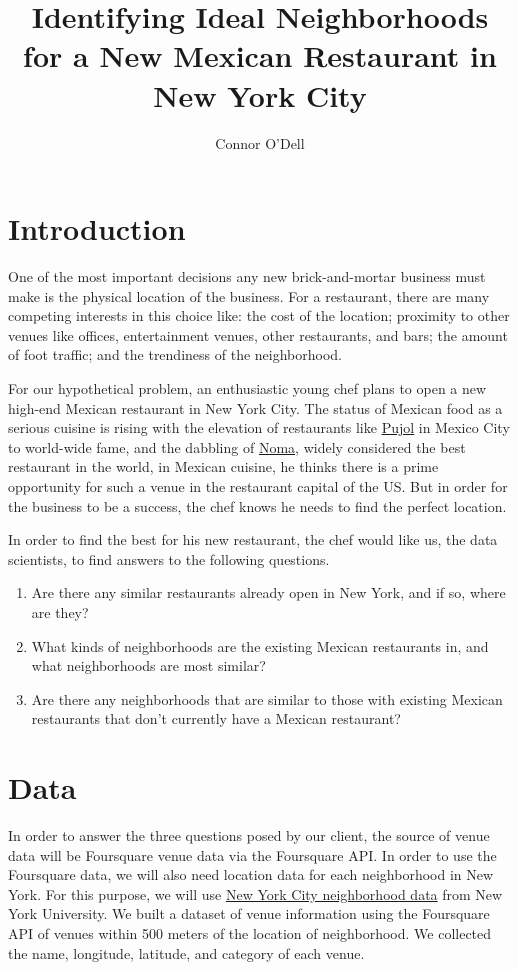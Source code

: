 \documentclass{article}
\title{Identifying Ideal Neighborhoods for a New Mexican Restaurant in New York City}
\author{Connor O'Dell}
\date{}
\begin{document}
\maketitle

\section{Introduction}

One of the most important decisions any new brick-and-mortar business must make is the physical location of the business. For a restaurant, there are many competing interests in this choice like: the cost of the location; proximity to other venues like offices, entertainment venues, other restaurants, and bars; the amount of foot traffic; and the trendiness of the neighborhood.

For our hypothetical problem, an enthusiastic young chef plans to open a new high-end Mexican restaurant in New York City. The status of Mexican food as a serious cuisine is rising with the elevation of restaurants like \href{http://pujol.com.mx}{Pujol} in Mexico City to world-wide fame, and the dabbling of \href{https://www.eater.com/2017/5/8/15578046/rene-redzepi-noma-mexico-jonathan-gold-reviews}{Noma}, widely considered the best restaurant in the world, in Mexican cuisine, he thinks there is a prime opportunity for such a venue in the restaurant capital of the US. But in order for the business to be a success, the chef knows he needs to find the perfect location. 

In order to find the best for his new restaurant, the chef would like us, the data scientists, to find answers to the following questions.

\begin{enumerate}
\item Are there any similar restaurants already open in New York, and if so, where are they?
\item What kinds of neighborhoods are the existing Mexican restaurants in, and what neighborhoods are most similar?
\item Are there any neighborhoods that are similar to those with existing Mexican restaurants that don't currently have a Mexican restaurant?
\end{enumerate}

\section{Data}

In order to answer the three questions posed by our client, the source of venue data will be Foursquare venue data via the Foursquare API. In order to use the Foursquare data, we will also need location data for each neighborhood in New York. For this purpose, we will use \href{https://geo.nyu.edu/catalog/nyu_2451_34572}{New York City neighborhood data} from New York University. We built a dataset of venue information using the Foursquare API of venues within 500 meters of the location of neighborhood. We collected the name, longitude, latitude, and category of each venue.
\end{document}
